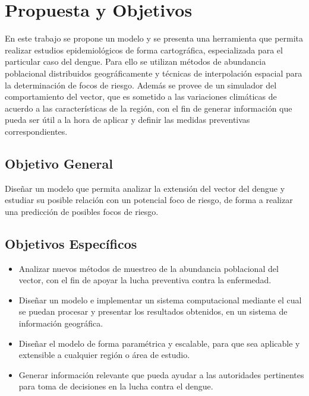 \section{Propuesta y Objetivos}
En este trabajo se propone un modelo y se presenta una herramienta que permita realizar estudios
epidemiológicos de forma cartográfica, especializada para el particular caso del dengue. Para ello
se utilizan métodos de abundancia poblacional distribuidos geográficamente y técnicas de
interpolación espacial para la determinación de focos de riesgo. Además se provee de un simulador
del comportamiento del vector, que es sometido a las variaciones climáticas de acuerdo a las
características de la región, con el fin de generar información que pueda ser útil a la hora de
aplicar y definir las medidas preventivas correspondientes.

\subsection{Objetivo General}
Diseñar un modelo que permita analizar la extensión del vector del dengue y estudiar su posible
relación con un potencial foco de riesgo, de forma a realizar una predicción de posibles focos de
riesgo.

\subsection{Objetivos Específicos}

\begin{itemize}

\item Analizar nuevos métodos de muestreo de la abundancia poblacional del vector, con el fin de apoyar la lucha preventiva contra la enfermedad.

\item Diseñar un modelo e implementar un sistema computacional mediante el cual se puedan procesar y presentar los resultados obtenidos, en un sistema de información geográfica.

\item Diseñar el modelo de forma paramétrica y escalable, para que sea aplicable y extensible a cualquier región o área de estudio.

\item Generar información relevante que pueda ayudar a las autoridades pertinentes para toma de decisiones en la lucha contra el dengue.

\end{itemize}

